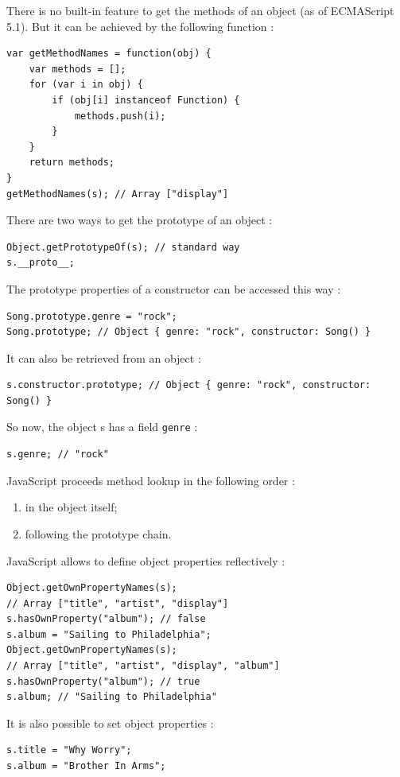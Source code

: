 \documentclass[a4paper,10pt]{article}
\begin{document}
There is no built-in feature to get the methods of an object (as of ECMAScript 5.1). But it can be achieved by the following function :
\begin{lstlisting}
var getMethodNames = function(obj) {
    var methods = [];
    for (var i in obj) {
        if (obj[i] instanceof Function) {
            methods.push(i);
        }
    }
    return methods;
}
getMethodNames(s); // Array ["display"]
\end{lstlisting}


There are two ways to get the prototype of an object :
\begin{lstlisting}
Object.getPrototypeOf(s); // standard way
s.__proto__;
\end{lstlisting}


The prototype properties of a constructor can be accessed this way :
\begin{lstlisting}
Song.prototype.genre = "rock";
Song.prototype; // Object { genre: "rock", constructor: Song() }
\end{lstlisting}

It can also be retrieved from an object :
\begin{lstlisting}
s.constructor.prototype; // Object { genre: "rock", constructor: Song() }
\end{lstlisting}

So now, the object s has a field \lstinline|genre| :
\begin{lstlisting}
s.genre; // "rock"
\end{lstlisting}

JavaScript proceeds method lookup in the following order :
\begin{enumerate}
\item in the object itself;
\item following the prototype chain.
\end{enumerate}


\bigskip
JavaScript allows to define object properties reflectively :
\begin{lstlisting}
Object.getOwnPropertyNames(s);
// Array ["title", "artist", "display"]
s.hasOwnProperty("album"); // false
s.album = "Sailing to Philadelphia";
Object.getOwnPropertyNames(s);
// Array ["title", "artist", "display", "album"]
s.hasOwnProperty("album"); // true
s.album; // "Sailing to Philadelphia"
\end{lstlisting}

It is also possible to set object properties :
\begin{lstlisting}
s.title = "Why Worry";
s.album = "Brother In Arms";
\end{lstlisting}
\end{document}
